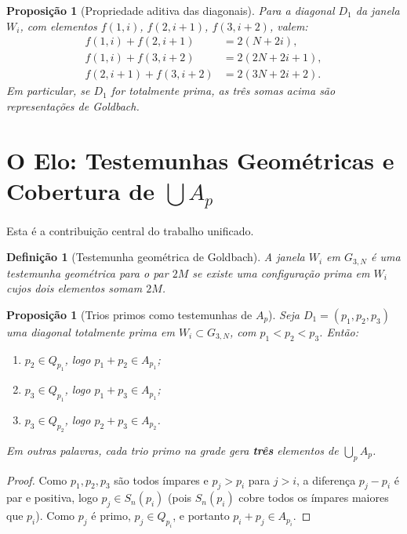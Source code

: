 \documentclass[12pt,a4paper]{article}
\newtheorem{proposition}[theorem]{Proposi\c{c}\~ao}
\newtheorem{definition}[theorem]{Defini\c{c}\~ao}
\theoremstyle{remark}
\begin{document}
	\begin{proposition}[Propriedade aditiva das diagonais]
		\label{prop:aditiva}
		Para a diagonal $D_1$ da janela $W_i$, com elementos
		$f(1,i)$, $f(2,i+1)$, $f(3,i+2)$, valem:
		\begin{align}
			f(1,i)+f(2,i+1)   &= 2(N+2i), \label{eq:s1}\\
			f(1,i)+f(3,i+2)   &= 2(2N+2i+1), \label{eq:s2}\\
			f(2,i+1)+f(3,i+2) &= 2(3N+2i+2). \label{eq:s3}
		\end{align}
		Em particular, se $D_1$ for totalmente prima,
		as tr\^es somas acima s\~ao representa\c{c}\~oes de Goldbach.
	\end{proposition}
	
	\section{O Elo: Testemunhas Geom\'etricas e Cobertura de $\bigcup A_p$}
	
	Esta \'e a contribui\c{c}\~ao central do trabalho unificado.
	
	\begin{definition}[Testemunha geométrica de Goldbach]
		A janela $W_i$ em $G_{3,N}$ \'e uma \emph{testemunha geom\'etrica} para o par $2M$ se
		existe uma configura\c{c}\~ao prima em $W_i$ cujos dois elementos somam $2M$.
	\end{definition}
	
	\begin{proposition}[Trios primos como testemunhas de $A_p$]
		\label{prop:elo}
		Seja $D_1 = (p_1,p_2,p_3)$ uma diagonal totalmente prima em $W_i\subset G_{3,N}$,
		com $p_1 < p_2 < p_3$.  Ent\~ao:
		\begin{enumerate}[\normalfont(i)]
			\item $p_2\in Q_{p_1}$, logo $p_1+p_2\in A_{p_1}$;
			\item $p_3\in Q_{p_1}$, logo $p_1+p_3\in A_{p_1}$;
			\item $p_3\in Q_{p_2}$, logo $p_2+p_3\in A_{p_2}$.
		\end{enumerate}
		Em outras palavras, cada trio primo na grade gera \textbf{tr\^es} elementos de
		$\bigcup_p A_p$.
	\end{proposition}
	\begin{proof}
		Como $p_1,p_2,p_3$ s\~ao todos \'impares e $p_j>p_i$ para $j>i$, a diferen\c{c}a
		$p_j - p_i$ \'e par e positiva, logo $p_j \in S_n(p_i)$
		(pois $S_n(p_i)$ cobre todos os \'impares maiores que $p_i$).
		Como $p_j$ \'e primo, $p_j\in Q_{p_i}$, e portanto $p_i+p_j\in A_{p_i}$.
	\end{proof}
	
\end{document}
